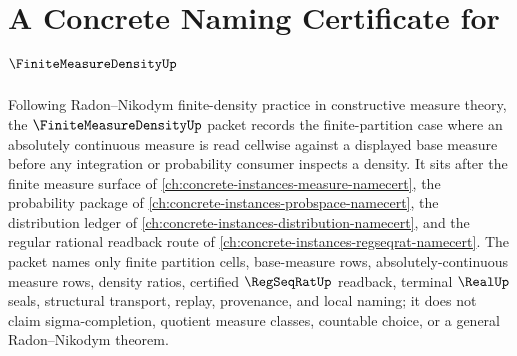 \chapter{A Concrete Naming Certificate for $\FiniteMeasureDensityUp$}
\label{ch:concrete-instances-finite-measure-density-namecert}

Following Radon--Nikodym finite-density practice in constructive measure theory, the $\FiniteMeasureDensityUp$ packet records the finite-partition case where an absolutely continuous measure is read cellwise against a displayed base measure before any integration or probability consumer inspects a density. It sits after the finite measure surface of \autoref{ch:concrete-instances-measure-namecert}, the probability package of \autoref{ch:concrete-instances-probspace-namecert}, the distribution ledger of \autoref{ch:concrete-instances-distribution-namecert}, and the regular rational readback route of \autoref{ch:concrete-instances-regseqrat-namecert}. The packet names only finite partition cells, base-measure rows, absolutely-continuous measure rows, density ratios, certified $\RegSeqRatUp$ readback, terminal $\RealUp$ seals, structural transport, replay, provenance, and local naming; it does not claim sigma-completion, quotient measure classes, countable choice, or a general Radon--Nikodym theorem.

